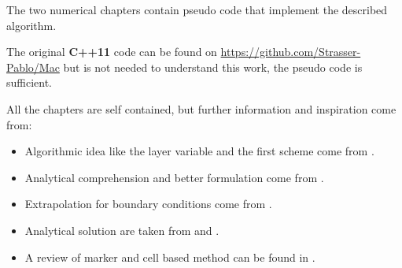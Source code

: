 \documentclass[a4paper]{master}
\begin{document}
The two numerical chapters contain pseudo code that implement the described algorithm.

The original \textbf{C++11} code can be found on \url{https://github.com/Strasser-Pablo/Mac}
but is not needed to understand this work, the pseudo code is sufficient.

All the chapters are self contained,
but further information and inspiration come from:
\begin{itemize}
 \item Algorithmic idea like the layer variable and the first scheme come from \cite{fluidforrestofus}.
 \item Analytical comprehension and better formulation come from \cite{citeulike:11163809}.
 \item Extrapolation for boundary conditions come from \cite{FLD:FLD148}.
 \item Analytical solution are taken from \cite{Batchelor} and \cite{Kampanis:2006:SGH:1148052.1148065}.
 \item A review of marker and cell based method can be found in \cite{citeulike:3055787}.
\end{itemize}









\nocite{*}

\end{document}

